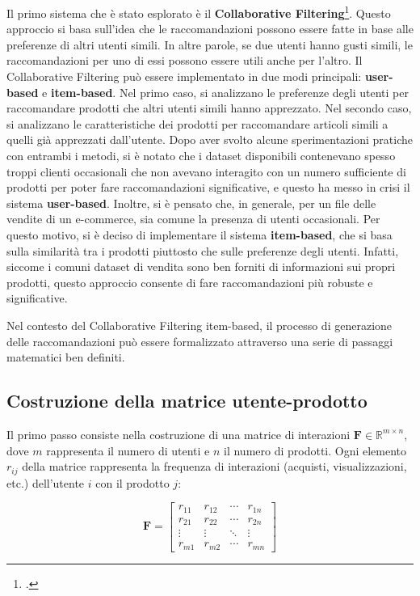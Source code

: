 Il primo sistema che è stato esplorato è il \textbf{Collaborative Filtering}\footcite{site:collaborative-filtering}. Questo approccio si basa sull'idea che le raccomandazioni possono essere fatte in base alle preferenze di altri utenti simili. In altre parole, se due utenti hanno gusti simili, le raccomandazioni per uno di essi possono essere utili anche per l'altro. Il Collaborative Filtering può essere implementato in due modi principali: \textbf{user-based} e \textbf{item-based}. Nel primo caso, si analizzano le preferenze degli utenti per raccomandare prodotti che altri utenti simili hanno apprezzato. Nel secondo caso, si analizzano le caratteristiche dei prodotti per raccomandare articoli simili a quelli già apprezzati dall'utente. Dopo aver svolto alcune sperimentazioni pratiche con entrambi i metodi, si è notato che i dataset disponibili contenevano spesso troppi clienti occasionali che non avevano interagito con un numero sufficiente di prodotti per poter fare raccomandazioni significative, e questo ha messo in crisi il sistema \textbf{user-based}. Inoltre, si è pensato che, in generale, per un file delle vendite di un e-commerce, sia comune la presenza di utenti occasionali. Per questo motivo, si è deciso di implementare il sistema \textbf{item-based}, che si basa sulla similarità tra i prodotti piuttosto che sulle preferenze degli utenti. Infatti, siccome i comuni dataset di vendita sono ben forniti di informazioni sui propri prodotti, questo approccio consente di fare raccomandazioni più robuste e significative.

Nel contesto del Collaborative Filtering item-based, il processo di generazione delle raccomandazioni può essere formalizzato attraverso una serie di passaggi matematici ben definiti.

\subsection{Costruzione della matrice utente-prodotto}
\label{sec:collaborative-filtering-matrice-utenti-prodotti}

Il primo passo consiste nella costruzione di una matrice di interazioni $\mathbf{F} \in \mathbb{R}^{m \times n}$, dove $m$ rappresenta il numero di utenti e $n$ il numero di prodotti. Ogni elemento $r_{ij}$ della matrice rappresenta la frequenza di interazioni (acquisti, visualizzazioni, etc.) dell'utente $i$ con il prodotto $j$:

\begin{equation}
\mathbf{F} = \begin{bmatrix}
r_{11} & r_{12} & \cdots & r_{1n} \\
r_{21} & r_{22} & \cdots & r_{2n} \\
\vdots & \vdots & \ddots & \vdots \\
r_{m1} & r_{m2} & \cdots & r_{mn}
\end{bmatrix}
\end{equation}


